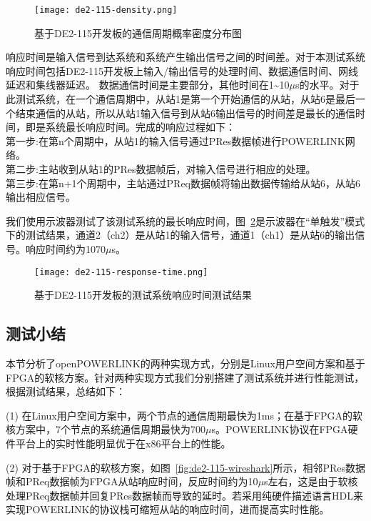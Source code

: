 \begin{figure}[!htb]
  \centering
  \texttt{[image: de2-115-density.png]}
  \caption{基于DE2-115开发板的通信周期概率密度分布图}
  \label{fig:de2-115-density}
\end{figure}

响应时间是输入信号到达系统和系统产生输出信号之间的时间差。对于本测试系统响应时间包括DE2-115开发板上输入/输出信号的处理时间、数据通信时间、网线延迟和集线器延迟。 数据通信时间是主要部分，其他时间在1\~{}10$\mu$s的水平。对于此测试系统，在一个通信周期中，从站1是第一个开始通信的从站，从站6是最后一个结束通信的从站，所以从站1输入信号到从站6输出信号的时间差是最长的通信时间，即是系统最长响应时间。完成的响应过程如下：\\
第一步:在第n个周期中，从站1的输入信号通过PRes数据帧进行POWERLINK网络。\\
第二步:主站收到从站1的PRes数据帧后，对输入信号进行相应的处理。\\
第三步:在第n+1个周期中，主站通过PReq数据帧将输出数据传输给从站6，从站6输出相应信号。

我们使用示波器测试了该测试系统的最长响应时间，图~\ref{fig:de2-115-response-time}是示波器在“单触发”模式下的测试结果，通道2（ch2）是从站1的输入信号，通道1（ch1）是从站6的输出信号。响应时间约为1070$\mu$s。

\begin{figure}[!htb]
  \centering
  \texttt{[image: de2-115-response-time.png]}
  \caption{基于DE2-115开发板的测试系统响应时间测试结果}
  \label{fig:de2-115-response-time}
\end{figure}

\subsection{测试小结}

本节分析了openPOWERLINK的两种实现方式，分别是Linux用户空间方案和基于FPGA的软核方案。针对两种实现方式我们分别搭建了测试系统并进行性能测试，根据测试结果，总结如下：

(1) 在Linux用户空间方案中，两个节点的通信周期最快为1ms；在基于FPGA的软核方案中，7个节点的系统通信周期最快为700$\mu$s。POWERLINK协议在FPGA硬件平台上的实时性能明显优于在x86平台上的性能。

(2) 对于基于FPGA的软核方案，如图~\ref{fig:de2-115-wireshark}所示，相邻PRes数据帧和PReq数据帧为FPGA从站响应时间，反应时间约为10$\mu$s左右，这是由于软核处理PReq数据帧并回复PRes数据帧而导致的延时。若采用纯硬件描述语言HDL来实现POWERLINK的协议栈可缩短从站的响应时间，进而提高实时性能。

